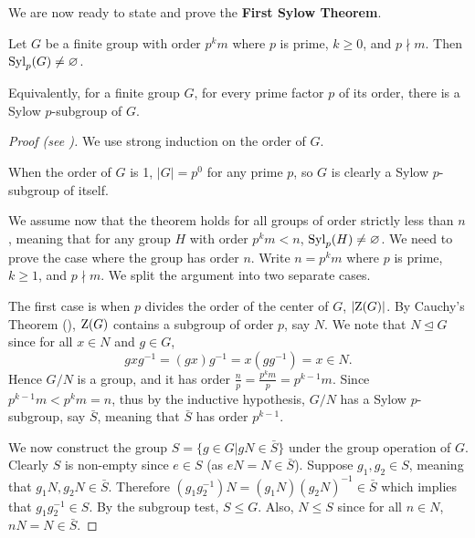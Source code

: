 We are now ready to state and prove the \textbf{First Sylow Theorem}.
\begin{theorem}[Sylow I]\label{thrm-sylow-1}
    Let $G$ be a finite group with order $p^k m$ where $p$ is prime, $k \geq 0$, and $p \nmid m$. Then $\mathrm{Syl}_{p}(G) \neq \varnothing$.
\end{theorem}
\begin{remark}
    Equivalently, for a finite group $G$, for every prime factor $p$ of its order, there is a Sylow $p$-subgroup of $G$.
\end{remark}
\begin{proof}[Proof (see {\cite[pp.~1--3]{mann_2011}})]
    We use strong induction on the order of $G$.

    When the order of $G$ is 1, $|G| = p^0$ for any prime $p$, so $G$ is clearly a Sylow $p$-subgroup of itself.

    We assume now that the theorem holds for all groups of order strictly less than $n$, meaning that for any group $H$ with order $p^k m < n$, $\mathrm{Syl}_{p}(H) \neq \varnothing$. We need to prove the case where the group has order $n$. Write $n = p^k m$ where $p$ is prime, $k \geq 1$, and $p \nmid m$. We split the argument into two separate cases.

    The first case is when $p$ divides the order of the center of $G$, $|\mathrm{Z}(G)|$. By Cauchy's Theorem (), $\mathrm{Z}(G)$ contains a subgroup of order $p$, say $N$. We note that $N \unlhd G$ since for all $x \in N$ and $g \in G$,
    \[
        gxg^{-1} = (gx)g^{-1} = x(gg^{-1}) = x \in N.
    \]
    Hence $G/N$ is a group, and it has order $\frac np = \frac{p^km}{p} = p^{k-1}m$. Since $p^{k-1}m < p^km = n$, thus by the inductive hypothesis, $G/N$ has a Sylow $p$-subgroup, say $\bar{S}$, meaning that $\bar{S}$ has order $p^{k-1}$.

    We now construct the group $S = \{g \in G \vert gN \in \bar{S}\}$ under the group operation of $G$. Clearly $S$ is non-empty since $e \in S$ (as $eN = N \in \bar{S}$). Suppose $g_1, g_2 \in S$, meaning that $g_1N, g_2N \in \bar{S}$. Therefore $(g_1g_2^{-1})N = (g_1N)(g_2N)^{-1} \in \bar{S}$ which implies that $g_1g_2^{-1} \in S$. By the subgroup test, $S \leq G$. Also, $N \leq S$ since for all $n \in N$, $nN = N \in \bar{S}$.


\end{proof}
